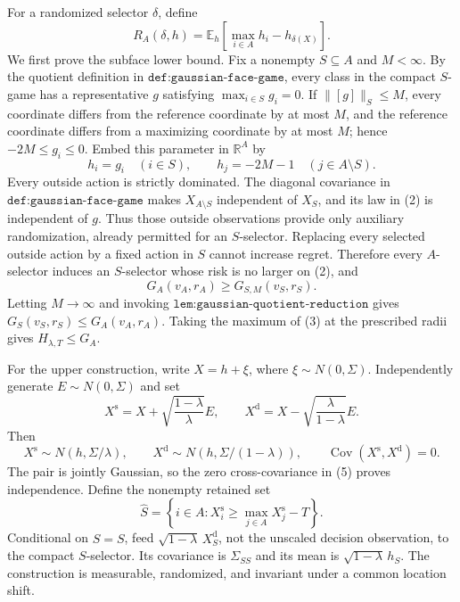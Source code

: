 For a randomized selector \(\delta\), define
\[
R_A(\delta,h)=\mathbb E_h\!\left[\max_{i\in A}h_i-h_{\delta(X)}\right]. \tag{1}
\]
We first prove the subface lower bound.  Fix a nonempty \(S\subseteq A\) and \(M<\infty\).  By the quotient definition in \(\texttt{def:gaussian-face-game}\), every class in the compact \(S\)-game has a representative \(g\) satisfying \(\max_{i\in S}g_i=0\).  If \(\lVert[g]\rVert_S\leq M\), every coordinate differs from the reference coordinate by at most \(M\), and the reference coordinate differs from a maximizing coordinate by at most \(M\); hence \(-2M\leq g_i\leq0\).  Embed this parameter in \(\mathbb R^A\) by
\[
h_i=g_i\quad(i\in S),\qquad h_j=-2M-1\quad(j\in A\setminus S). \tag{2}
\]
Every outside action is strictly dominated.  The diagonal covariance in \(\texttt{def:gaussian-face-game}\) makes \(X_{A\setminus S}\) independent of \(X_S\), and its law in (2) is independent of \(g\).  Thus those outside observations provide only auxiliary randomization, already permitted for an \(S\)-selector.  Replacing every selected outside action by a fixed action in \(S\) cannot increase regret.  Therefore every \(A\)-selector induces an \(S\)-selector whose risk is no larger on (2), and
\[
G_A(v_A,r_A)\geq G_{S,M}(v_S,r_S). \tag{3}
\]
Letting \(M\to\infty\) and invoking \(\texttt{lem:gaussian-quotient-reduction}\) gives \(G_S(v_S,r_S)\leq G_A(v_A,r_A)\).  Taking the maximum of (3) at the prescribed radii gives \(H_{\lambda,T}\leq G_A\).

For the upper construction, write \(X=h+\xi\), where \(\xi\sim N(0,\Sigma)\).  Independently generate \(E\sim N(0,\Sigma)\) and set
\[
X^{\mathrm s}=X+\sqrt{\frac{1-\lambda}{\lambda}}E,
\qquad
X^{\mathrm d}=X-\sqrt{\frac{\lambda}{1-\lambda}}E. \tag{4}
\]
Then
\[
X^{\mathrm s}\sim N(h,\Sigma/\lambda),\qquad
X^{\mathrm d}\sim N(h,\Sigma/(1-\lambda)),
\qquad \operatorname{Cov}(X^{\mathrm s},X^{\mathrm d})=0. \tag{5}
\]
The pair is jointly Gaussian, so the zero cross-covariance in (5) proves independence.  Define the nonempty retained set
\[
\widehat S=\left\{i\in A:X_i^{\mathrm s}\geq\max_{j\in A}X_j^{\mathrm s}-T\right\}. \tag{6}
\]
Conditional on \(\widehat S=S\), feed \(\sqrt{1-\lambda}\,X_S^{\mathrm d}\), not the unscaled decision observation, to the compact \(S\)-selector.  Its covariance is \(\Sigma_{SS}\) and its mean is \(\sqrt{1-\lambda}\,h_S\).  The construction is measurable, randomized, and invariant under a common location shift.

